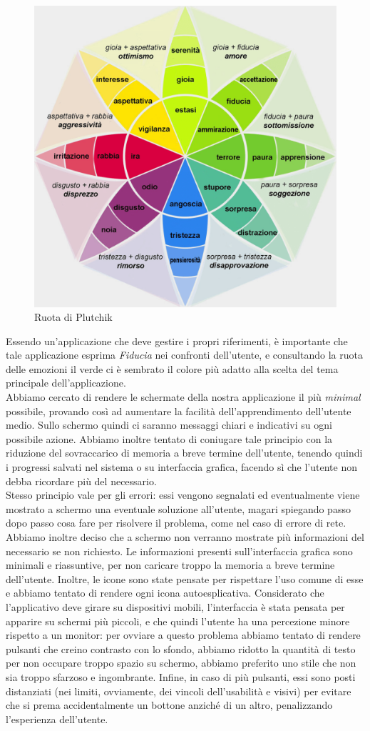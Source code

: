 \begin{figure}[H]
    \centering
            \includegraphics[width=.40\textwidth]{Immagini/Ruota di Plutchik.png} 
    \caption{Ruota di Plutchik}
\end{figure}

Essendo un'applicazione che deve gestire i propri riferimenti, è importante che tale applicazione esprima \textit{Fiducia} nei confronti dell'utente, e consultando la ruota delle emozioni il verde ci è sembrato il colore più adatto alla scelta del tema principale dell'applicazione. \\
Abbiamo cercato di rendere le schermate della nostra applicazione il più \textit{minimal} possibile, provando così ad aumentare la facilità dell'apprendimento dell'utente medio. Sullo schermo quindi ci saranno messaggi chiari e indicativi su ogni possibile azione. Abbiamo inoltre tentato di coniugare tale principio con la riduzione del sovraccarico di memoria a breve termine dell'utente, tenendo quindi i progressi salvati nel sistema o su interfaccia grafica, facendo sì che l'utente non debba ricordare più del necessario. \\
Stesso principio vale per gli errori: essi vengono segnalati ed eventualmente viene mostrato a schermo una eventuale soluzione all'utente, magari spiegando passo dopo passo cosa fare per risolvere il problema, come nel caso di errore di rete. 
Abbiamo inoltre deciso che a schermo non verranno mostrate più informazioni del necessario se non richiesto. Le informazioni presenti sull'interfaccia grafica sono minimali e riassuntive, per non caricare troppo la memoria a breve termine dell'utente. Inoltre, le icone sono state pensate per rispettare l'uso comune di esse e abbiamo tentato di rendere ogni icona autoesplicativa. Considerato che l'applicativo deve girare su dispositivi mobili, l'interfaccia è stata pensata per apparire su schermi più piccoli, e che quindi l'utente ha una percezione minore rispetto a un monitor: per ovviare a questo problema abbiamo tentato di rendere pulsanti che creino contrasto con lo sfondo, abbiamo ridotto la quantità di testo per non occupare troppo spazio su schermo, abbiamo preferito uno stile che non sia troppo sfarzoso e ingombrante. Infine, in caso di più pulsanti, essi sono posti distanziati (nei limiti, ovviamente, dei vincoli dell'usabilità e visivi) per evitare che si prema accidentalmente un bottone anziché di un altro, penalizzando l'esperienza dell'utente.

